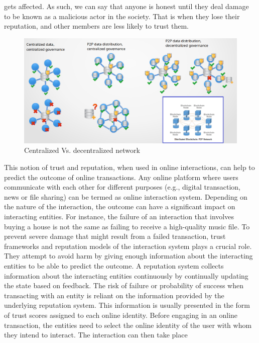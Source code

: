 gets affected. As such, we can say that anyone is honest until they deal damage
to be known as a malicious actor in the society. That is when they lose their
reputation, and other members are less likely to trust them. \par 
\begin{figure}
	\begin{center}
		\includegraphics[width=1.0\textwidth]{Images/WhyBlockchain.eps}
		\caption{Centralized Vs. decentralized network}
		\label{fig:WhyBlockchain}
	\end{center}
\end{figure}
This notion of trust and reputation, when used in online interactions, can help
to predict the outcome of online transactions. Any online platform where users
communicate with each other for different purposes (e.g., digital transaction,
news or file sharing) can be termed as online interaction system. Depending on
the nature of the interaction, the outcome can have a significant impact on
interacting entities. For instance, the failure of an interaction that involves
buying a house is not the same as failing to receive a high-quality music file.
To prevent severe damage that might result from a failed transaction, trust
frameworks and reputation models of the interaction system plays a crucial
role. They attempt to avoid harm by giving enough information about the
interacting entities to be able to predict the outcome. A reputation system
collects information about the interacting entities continuously by continually
updating the state based on feedback. The risk of failure or probability of
success when transacting with an entity is reliant on the information provided
by the underlying reputation system. This information is usually presented in
the form of trust scores assigned to each online identity. Before engaging in
an online transaction, the entities need to select the online identity of the
user with whom they intend to interact. The interaction can then take place
